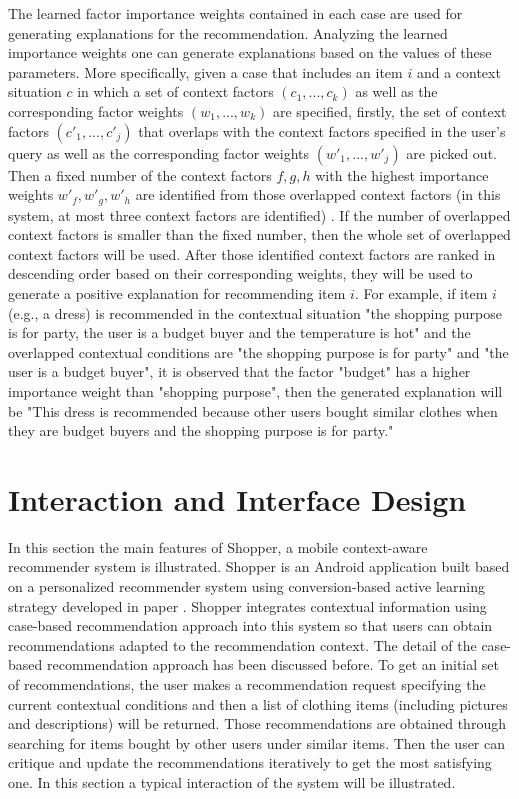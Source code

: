 The learned factor importance weights contained in each case are used for generating explanations for the recommendation.  Analyzing the learned importance weights one can generate explanations based on the values of these parameters. More specifically, given a case that includes an item $i$ and a context situation $c$ in which a set of context factors $(c_1, ..., c_k)$ as well as the corresponding factor weights $(w_1, ..., w_k)$ are specified, firstly, the set of context factors $(c\prime_1, ..., c\prime_j)$ that overlaps with the context factors specified in the user's query as well as the corresponding factor weights $(w\prime_1, ..., w\prime_j)$ are picked out. Then a fixed number of the context factors $f, g, h$ with the highest importance weights $w\prime_f, w\prime_g, w\prime_h$ are identified from those overlapped context factors (in this system, at most three context factors are identified) . If the number of overlapped context factors is smaller than the fixed number, then the whole set of overlapped context factors will be used. After those identified context factors are ranked in descending order based on their corresponding weights, they will be used to generate a positive explanation for recommending item $i$. For example, if item $i$ (e.g., a dress) is recommended in the contextual situation "the shopping purpose is for party, the user is a budget buyer and the temperature is hot" and the overlapped contextual conditions are "the shopping purpose is for party" and "the user is a budget buyer", it is observed that the factor "budget" has a higher importance weight than "shopping purpose", then the generated explanation will be "This dress is recommended because other users bought similar clothes when they are budget buyers and the shopping purpose is for party."

\section{Interaction and Interface Design} \label{sec:eg}

In this section the main features of Shopper, a mobile context-aware recommender system is illustrated. Shopper is an Android application built based on a personalized recommender system using conversion-based active learning strategy developed in paper \cite{ref:30}. Shopper integrates contextual information using case-based recommendation approach into this system so that users can obtain recommendations adapted to the recommendation context. The detail of the case-based recommendation approach has been discussed before. To get an initial set of recommendations, the user makes a recommendation request specifying the current contextual conditions and then a list of clothing items (including pictures and descriptions) will be returned. Those recommendations are obtained through searching for items bought by other users under similar items. Then the user can critique and update the recommendations iteratively to get the most satisfying one. In this section a typical interaction of the system will be illustrated.

